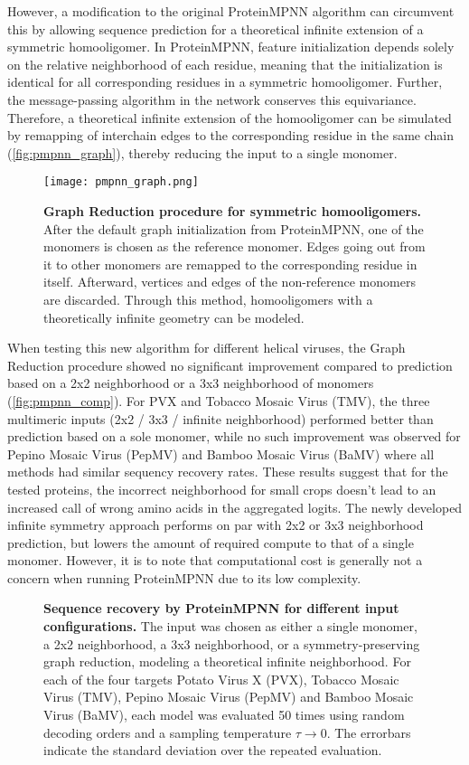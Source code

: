 However, a modification to the original ProteinMPNN algorithm can circumvent this by allowing sequence prediction for a theoretical infinite extension of a symmetric homooligomer. In ProteinMPNN, feature initialization depends solely on the relative neighborhood of each residue, meaning that the initialization is identical for all corresponding residues in a symmetric homooligomer. Further, the message-passing algorithm in the network conserves this equivariance. Therefore, a theoretical infinite extension of the homooligomer can be simulated by remapping of interchain edges to the corresponding residue in the same chain (\autoref{fig:pmpnn_graph}), thereby reducing the input to a single monomer. 

\begin{figure}
\centering
\texttt{[image: pmpnn\_graph.png]}
\caption{\textbf{Graph Reduction procedure for symmetric homooligomers.} After the default graph initialization from ProteinMPNN, one of the monomers is chosen as the reference monomer. Edges going out from it to other monomers are remapped to the corresponding residue in itself. Afterward, vertices and edges of the non-reference monomers are discarded. Through this method, homooligomers with a theoretically infinite geometry can be modeled. }
\label{fig:pmpnn_graph}
\end{figure}

When testing this new algorithm for different helical viruses, the Graph Reduction procedure showed no significant improvement compared to prediction based on a 2x2 neighborhood or a 3x3 neighborhood of monomers (\autoref{fig:pmpnn_comp}). For PVX and Tobacco Mosaic Virus (TMV), the three multimeric inputs (2x2 / 3x3 / infinite neighborhood) performed better than prediction based on a sole monomer, while no such improvement was observed for Pepino Mosaic Virus (PepMV) and Bamboo Mosaic Virus (BaMV) where all methods had similar sequency recovery rates. These results suggest that for the tested proteins, the incorrect neighborhood for small crops doesn't lead to an increased call of wrong amino acids in the aggregated logits. The newly developed infinite symmetry approach performs on par with 2x2 or 3x3 neighborhood prediction, but lowers the amount of required compute to that of a single monomer. However, it is to note that computational cost is generally not a concern when running ProteinMPNN due to its low complexity. 

\begin{figure}
\centering

\caption{\textbf{Sequence recovery by ProteinMPNN for different input configurations.} The input was chosen as either a single monomer, a 2x2 neighborhood, a 3x3 neighborhood, or a symmetry-preserving graph reduction, modeling a theoretical infinite neighborhood. For each of the four targets Potato Virus X (PVX), Tobacco Mosaic Virus (TMV), Pepino Mosaic Virus (PepMV) and Bamboo Mosaic Virus (BaMV), each model was evaluated 50 times using random decoding orders and a sampling temperature $\tau\rightarrow 0$. The errorbars indicate the standard deviation over the repeated evaluation. }
\label{fig:pmpnn_comp}
\end{figure}

